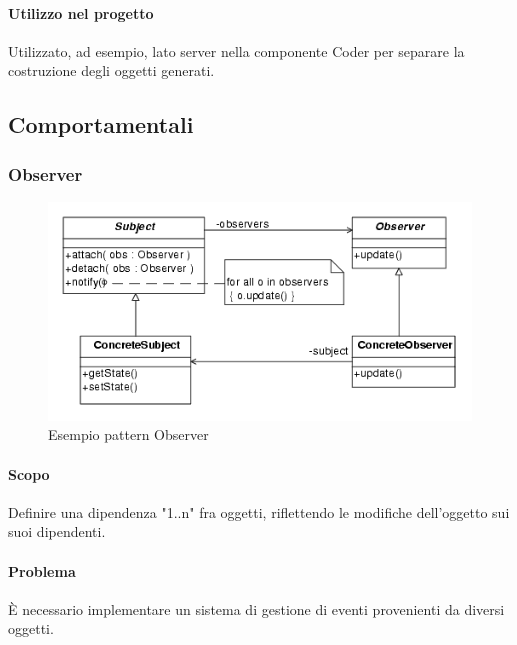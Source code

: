 \documentclass[../PianoDiQualifica.tex]{subfiles}
\begin{document}
				\paragraph{Utilizzo nel progetto\\}
					Utilizzato, ad esempio, lato server nella componente Coder per separare la
					costruzione degli oggetti generati.
		\subsection{Comportamentali}
			\subsubsection{Observer}
				\begin{figure}[H] \label{fig:Observer}
					\centering
					\includegraphics[scale=0.6]{Immagini/ObserverEx.png}
					\caption{Esempio pattern Observer}
				\end{figure}
				\paragraph{Scopo\\}
					Definire una dipendenza "1..n" fra oggetti, riflettendo le modifiche dell'oggetto
					sui suoi dipendenti.
				\paragraph{Problema\\}
					È necessario implementare un sistema di gestione di eventi provenienti da diversi
					oggetti.
\end{document}
